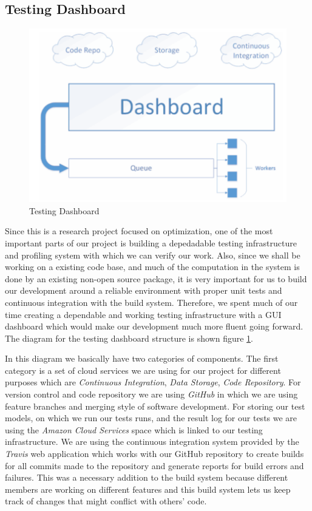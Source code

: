 \documentclass[11pt]{article}
\theoremstyle{definition}
\begin{document}
\subsection{Testing Dashboard}
\begin{figure}
	\caption{Testing Dashboard} \label{fig:dashboard}
	\includegraphics[width=\textwidth]{images/dashboard}
\end{figure}

Since this is a research project focused on optimization, one of the most important parts of our project is building a depedadable testing infrastructure and profiling system with which we can verify our work. Also, since we shall be working on a existing code base, and much of the computation in the system is done by an existing non-open source package, it is very important for us to build our development around a reliable environment with proper unit tests and continuous integration with the build system. Therefore, we spent much of our time creating a dependable and working testing infrastructure with a GUI dashboard which would make our development much more fluent going forward. The diagram for the testing dashboard structure is shown figure \ref{fig:dashboard}.

In this diagram we basically have two categories of components. The first category is a set of cloud services we are using for our project for different purposes which are \emph{Continuous Integration}, \emph{Data Storage}, \emph{Code Repository}. For version control and code repository we are using \emph{GitHub} \cite{ref:github} in which we are using feature branches and merging style of software development. For storing our test models, on which we run 
our tests runs, and the result log for our tests we are using the \emph{Amazon Cloud Services} space which is linked to our testing infrastructure. We are using the continuous integration system provided by the \emph{Travis} \cite{ref:travis} web application which works with our GitHub repository to create builds for all commits made to the repository and generate reports for build errors and failures. This was a necessary addition to the build system because different members are working on different features and this build system lets us keep track of changes that might conflict with others' code.
\end{document}
